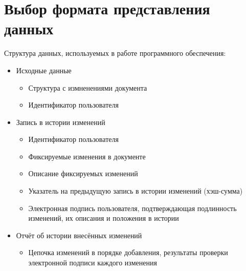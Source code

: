 \section{Выбор формата представления данных} \label{technologic_data}

Структура данных, используемых в работе программного обеспечения:
\begin{itemize}
	\item Исходные данные
	\begin{itemize}
		\item Структура с измненениями документа
		\item Идентификатор пользователя
	\end{itemize}
	\item Запись в истории изменений
	\begin{itemize}
		\item Идентификатор пользователя
		\item Фиксируемые изменения в документе
		\item Описание фиксируемых изменений
		\item Указатель на предыдущую запись в истории изменений (хэш-сумма)
		\item Электронная подпись пользователя, подтверждающая подлинность изменений, их описания и положения в истории
	\end{itemize}
	\item Отчёт об истории внесённых изменений
	\begin{itemize}
		\item Цепочка изменений в порядке добавления, результаты проверки электронной подписи каждого изменения
	\end{itemize}
\end{itemize}